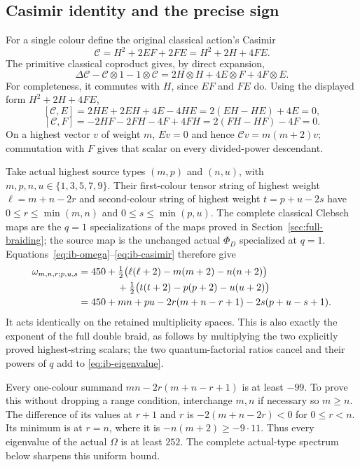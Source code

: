 \subsection{Casimir identity and the precise sign}
For a single colour define the original classical action's Casimir
\[
 \mathcal C=H^2+2EF+2FE=H^2+2H+4FE.
\]
The primitive classical coproduct gives, by direct expansion,
\begin{equation}
 \Delta\mathcal C-\mathcal C\otimes1-1\otimes\mathcal C
 =2H\otimes H+4E\otimes F+4F\otimes E.
 \label{eq:ib-casimir}
\end{equation}
For completeness, it commutes with $H$, since $EF$ and $FE$ do.
Using the displayed form $H^2+2H+4FE$,
\[
 [\mathcal C,E]=2HE+2EH+4E-4HE
              =2(EH-HE)+4E=0,
\]
\[
 [\mathcal C,F]=-2HF-2FH-4F+4FH
              =2(FH-HF)-4F=0.
\]
On a highest vector $v$ of weight $m$, $Ev=0$ and hence
$\mathcal Cv=m(m+2)v$; commutation with $F$ gives that scalar
on every divided-power descendant.

Take actual highest source types $(m,p)$ and $(n,u)$, with
$m,p,n,u\in\{1,3,5,7,9\}$. Their first-colour tensor string of
highest weight $\ell=m+n-2r$ and second-colour string of highest
weight $t=p+u-2s$ have
$0\le r\le\min(m,n)$ and $0\le s\le\min(p,u)$.
The complete classical Clebsch maps are the $q=1$ specializations
of the maps proved in Section~\ref{sec:full-braiding}; the source
map is the unchanged actual $\Phi_D$ specialized at $q=1$.
Equations~\eqref{eq:ib-omega}--\eqref{eq:ib-casimir} therefore give
\begin{align}
 \omega_{m,n,r;p,u,s}
 &=450+\tfrac12\bigl(\ell(\ell+2)-m(m+2)-n(n+2)\bigr)
       \nonumber\\
 &\hspace{14mm}+\tfrac12\bigl(t(t+2)-p(p+2)-u(u+2)\bigr)
       \nonumber\\
 &=450+mn+pu-2r(m+n-r+1)-2s(p+u-s+1).
 \label{eq:ib-eigenvalue}
\end{align}
It acts identically on the retained multiplicity spaces. This is
also exactly the exponent of the full double braid, as follows
by multiplying the two explicitly proved highest-string scalars;
the two quantum-factorial ratios cancel and their powers of $q$
add to \eqref{eq:ib-eigenvalue}.

Every one-colour summand $mn-2r(m+n-r+1)$ is at least $-99$.
To prove this without dropping a range condition, interchange
$m,n$ if necessary so $m\ge n$. The difference of its values at
$r+1$ and $r$ is $-2(m+n-2r)<0$ for $0\le r<n$.
Its minimum is at $r=n$, where it is $-n(m+2)\ge-9\cdot11$.
Thus every eigenvalue of the actual $\Omega$ is at least $252$.
The complete actual-type spectrum below sharpens this uniform bound.

